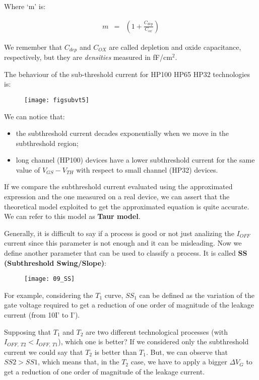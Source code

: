 \documentclass[a4paper, 12pt, twoside, openright]{report}
\begin{document}
Where `m' is:

    \begin{eqnarray*}
       {m}&=& \left(1 +\frac{C_{dep}}{C_{ox}}\right)
     \end{eqnarray*}

We remember that $C_{dep}$ and $C_{OX}$ are called depletion and oxide capacitance, respectively, but they are \emph{densities} measured in fF/cm$^{2}$.

The behaviour of the sub-threshold current for HP100 HP65 HP32 technologies is:

	\begin{figure}[H]
	\centering
	\texttt{[image: figsubvt5]}
	\caption{}
	\label{}
	\end{figure}

We can notice that:

\begin{itemize}
\item the subthreshold current decades exponentially when we move in the subthreshold region;
\item long channel (HP100) devices have a lower subthreshold current for the same value of $V_{GS} - V_{TH}$ with respect to small channel (HP32) devices.
\end{itemize}

If we compare the subthreshold current evaluated using the approximated expression and the one measured on a real device, we can assert that the theoretical model exploited to get the approximated equation is quite accurate. We can refer to this model as \textbf{Taur model}.

Generally, it is difficult to say if a process is good or not just analizing the $I_{OFF}$ current since this parameter is not enough and it can be misleading. Now we define another parameter that can be used to classify a process. It is called \textbf{SS (Subthreshold Swing/Slope)}:

	\begin{figure}[H]
	\centering
	\texttt{[image: 09\_SS]}
	\caption{}
	\label{}
	\end{figure}

For example, considering the $T_{1}$ curve, $SS_{1}$ can be defined as the variation of the gate voltage required to get a reduction of one order of magnitude of the leakage current (from 10I' to I').

Supposing that $T_{1}$ and $T_{2}$ are two different technological processes (with $I_{OFF,\ T2} < I_{OFF,\ T1}$), which one is better? If we considered only the subthreshold current we could say that $T_{2}$ is better than $T_{1}$. But, we can observe that $SS2 > SS1$, which means that, in the $T_{2}$ case, we have to apply a bigger $\Delta V_G$ to get a reduction of one order of magnitude of the leakage current.
\end{document}
